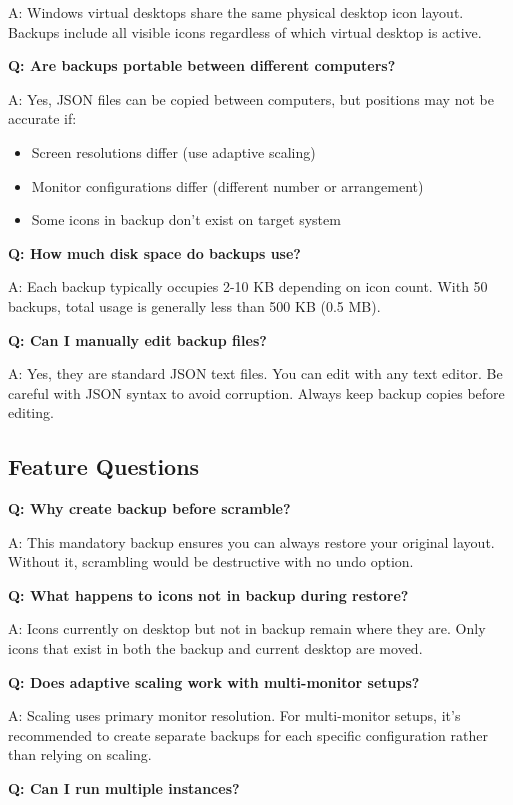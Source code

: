 \documentclass[a4paper,11pt]{article}
\begin{document}
A: Windows virtual desktops share the same physical desktop icon
layout. Backups include all visible icons regardless of which virtual
desktop is active.

\textbf{Q: Are backups portable between different computers?}

A: Yes, JSON files can be copied between computers, but positions may
not be accurate if:
\begin{itemize}
  \item Screen resolutions differ (use adaptive scaling)
  \item Monitor configurations differ (different number or arrangement)
  \item Some icons in backup don't exist on target system
\end{itemize}

\textbf{Q: How much disk space do backups use?}

A: Each backup typically occupies 2-10 KB depending on icon count.
With 50 backups, total usage is generally less than 500 KB (0.5 MB).

\textbf{Q: Can I manually edit backup files?}

A: Yes, they are standard JSON text files. You can edit with any text
editor. Be careful with JSON syntax to avoid corruption. Always keep
backup copies before editing.

\subsection{Feature Questions}

\textbf{Q: Why create backup before scramble?}

A: This mandatory backup ensures you can always restore your original
layout. Without it, scrambling would be destructive with no undo option.

\textbf{Q: What happens to icons not in backup during restore?}

A: Icons currently on desktop but not in backup remain where they
are. Only icons that exist in both the backup and current desktop are moved.

\textbf{Q: Does adaptive scaling work with multi-monitor setups?}

A: Scaling uses primary monitor resolution. For multi-monitor setups,
it's recommended to create separate backups for each specific
configuration rather than relying on scaling.

\textbf{Q: Can I run multiple instances?}
\end{document}
